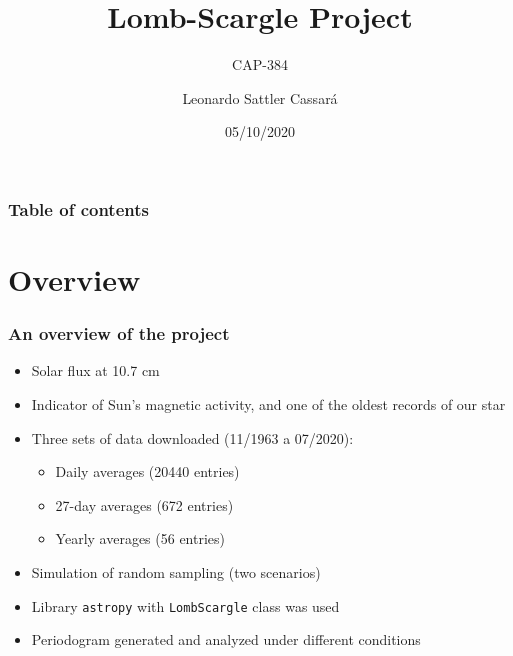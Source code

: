 \documentclass{beamer}
\title{Lomb-Scargle Project}
\subtitle{CAP-384}
\author{Leonardo Sattler Cassará}
\institute{INPE}
\date{05/10/2020}
\begin{document}
\begin{frame}
\titlepage
\end{frame}

\begin{frame}
\label{contents}
\frametitle{Table of contents}
\tableofcontents
\end{frame}

\section{Overview}

\begin{frame}
\frametitle{An overview of the project}
\begin{itemize}
\item Solar flux at 10.7 cm
\item Indicator of Sun's magnetic activity, and one of the oldest records of our star
\item Three sets of data downloaded (11/1963 a 07/2020):
\begin{itemize}
\item Daily averages (20440 entries)
\item 27-day averages (672 entries)
\item Yearly averages (56 entries)
\end{itemize}
\item Simulation of random sampling (two scenarios)
\item Library \texttt{astropy} with \texttt{LombScargle} class was used
\item Periodogram generated and analyzed under different conditions
\end{itemize}
\end{frame}

\end{document}
